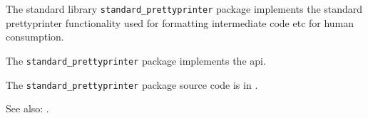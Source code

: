 
The standard library {\tt standard\_prettyprinter} package implements the standard prettyprinter functionality used for formatting intermediate code etc for human consumption.

The {\tt standard\_prettyprinter} package implements the  api.

The {\tt standard\_prettyprinter} package source code is in .

See also:  .


